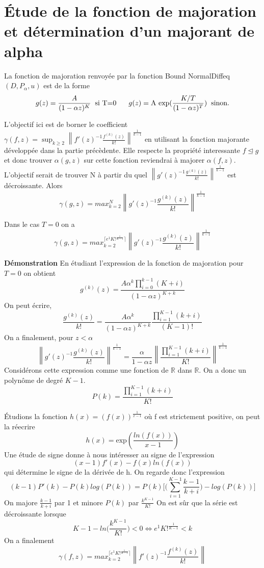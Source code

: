 \documentclass[a4paper,10.5pt]{article}
\begin{document}
	
	
	\section{Étude de la fonction de majoration et détermination d'un majorant de alpha}
	La fonction de majoration renvoyée par la fonction Bound NormalDiffeq$(D,P_{\alpha},u)$  est de la  forme
	\[g(z)=\frac{A}{(1-\alpha z)^{K}} \hspace{2mm}\text{si T=0}\hspace{6mm} g(z)=\text{A exp}(\frac{K/T}{(1-\alpha z)^{T}}) \hspace{2mm} \text{sinon.} \]
	
	\noindent L'objectif ici est de borner le coefficient $\gamma(f,z)=\sup_{k \geq 2} \left\|f'(z)^{-1}\frac{f^{(k)}(z)}{k!}\right\|^{\frac{1}{k-1}}$ en utilisant la fonction majorante développée dans la partie précèdente. Elle respecte la propriété interessante $f\unlhd g$ et donc trouver $\alpha(g,z)$ sur cette fonction reviendrai à majorer $\alpha(f,z)$. L'objectif serait de trouver N à partir du quel $\left\|g'(z)^{-1}\frac{g^{(k)}(z)}{k!}\right\|^{\frac{1}{k-1}}$ est décroissante. Alors 
	\[\gamma(g,z)=max_{k=2}^{N}\left\|g'(z)^{-1}\frac{g^{(k)}(z)}{k!}\right\|^{\frac{1}{k-1}}\] 
	
	\begin{proposition} Dans le cas $T=0$ on a \[\gamma(g,z)=max_{k=2}^{\lceil e^{1}K!^{\frac{1}{K-1}} \rceil}\left\|g'(z)^{-1}\frac{g^{(k)}(z)}{k!}\right\|^{\frac{1}{k-1}}\]
	\end{proposition}

	\noindent\textbf{Démonstration}
	\noindent En étudiant l'expression de la fonction de majoration pour $T=0$ on obtient
	\[g^{(k)}(z)=\frac{A\alpha^{k}\prod_{i=0}^{k-1}(K+i)}{(1-\alpha z)^{K+k}}\]
	On peut écrire,
	\[\frac{g^{(k)}(z)}{k!}=\frac{A\alpha^{k}}{(1-\alpha z)^{K+k}} \frac{\prod_{i=1}^{K-1}(k+i)}{(K-1)!} \]
	On a finalement, pour $z < \alpha$ 
	\[\left\|g'(z)^{-1}\frac{g^{(k)}(z)}{k!}\right\|^{\frac{1}{k-1}}= \frac{\alpha}{1-\alpha z} \left\|\frac{\prod_{i=1}^{K-1}(k+i)}{K!}\right\|^{\frac{1}{k-1}} \tag{*}\]
	Considérons cette expression comme une fonction de $\mathbb{R}$ dans $\mathbb{R}$. On a donc un polynôme de degré $K-1$.
	\[P(k)=\frac{\prod_{i=1}^{K-1}(k+i)}{K!}\]
	
	
	\noindent Étudions la fonction $h(x)=(f(x))^{\frac{1}{x-1}}$ où f est strictement positive, on peut la réecrire
	\[h(x)=\text{exp}(\frac{ln(f(x))}{x-1}) \]
	Une étude de signe donne à nous intéresser au signe de l'expression
	\[(x-1)f'(x)-f(x)ln(f(x)) \tag{1}\] 
	qui détermine le signe de la dérivée de h. On regarde donc l'expression 
	\[(k-1)P'(k)-P(k)log(P(k))=P(k)\Big[\big(\sum_{i=1}^{K-1}\frac{k-1}{k+i}\big)-log(P(k))\Big]\]
	On majore $\frac{k-1}{k+i}$ par 1 et minore $P(k)$ par $\frac{k^{K-1}}{K!}$ On est sûr que la série est décroissante lorsque 
	\[K-1-ln\big(\frac{k^{K-1}}{K!}\big)<0 \Longleftrightarrow e^{1}K!^{\frac{1}{K-1}}< k\]
	On a finalement 
	\[\gamma(f,z)=max_{k=2}^{\lceil e^{1}K!^{\frac{1}{K-1}} \rceil}\left\|f'(z)^{-1}\frac{f^{(k)}(z)}{k!}\right\| \]
	
\end{document}
